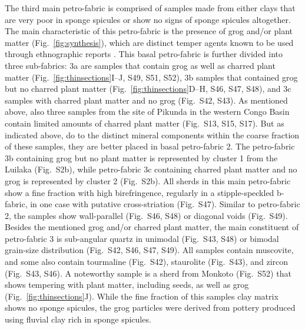 \documentclass[preprint,10pt,oneside,onecolumn,authoryear]{elsarticle}
\begin{document}
The third main petro-fabric is comprised of samples made from either clays that are very poor in sponge spicules or show no signs of sponge spicules altogether. The main characteristic of this petro-fabric is the presence of grog and/or plant matter (Fig.~\ref{fig:synthesis}), which are distinct temper agents known to be used through ethnographic reports \citep[33 Map 2]{Drost.1967}. This basal petro-fabric is further divided into three sub-fabrics: 3a are samples that contain grog as well as charred plant matter (Fig.~\ref{fig:thinsections}I--J, S49, S51, S52), 3b samples that contained grog but no charred plant matter (Fig.~\ref{fig:thinsections}D--H, S46, S47, S48), and 3c samples with charred plant matter and no grog (Fig.~S42, S43). As mentioned above, also three samples from the site of Pikunda in the western Congo Basin contain limited amounts of charred plant matter (Fig.~S13, S15, S17). But as indicated above, do to the distinct mineral components within the coarse fraction of these samples, they are better placed in basal petro-fabric 2. The petro-fabric 3b containing grog but no plant matter is represented by cluster 1 from the Luilaka (Fig.~S2b), while petro-fabric 3c containing charred plant matter and no grog is represented by cluster 2 (Fig.~S2b). All sherds in this main petro-fabric show a fine fraction with high birefringence, regularly in a stipple-speckled b-fabric, in one case with putative cross-striation (Fig.~S47). Similar to petro-fabric 2, the samples show wall-parallel (Fig.~S46, S48) or diagonal voids (Fig.~S49). Besides the mentioned grog and/or charred plant matter, the main constituent of petro-fabric 3 is sub-angular quartz in unimodal (Fig.~S43, S48) or bimodal grain-size distribution (Fig.~S42, S46, S47, S49). All samples contain muscovite, and some also contain tourmaline (Fig.~S42), staurolite (Fig.~S43), and zircon (Fig.~S43, S46). A noteworthy sample is a sherd from Monkoto (Fig.~S52) that shows tempering with plant matter, including seeds, as well as grog (Fig.~\ref{fig:thinsections}J). While the fine fraction of this samples clay matrix shows no sponge spicules, the grog particles were derived from pottery produced using fluvial clay rich in sponge spicules. 
\end{document}
